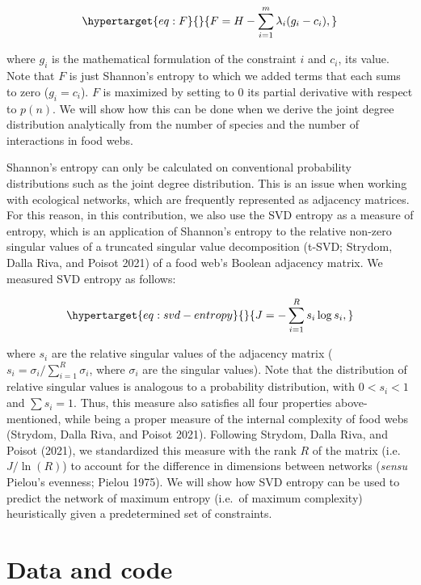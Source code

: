 \documentclass[11pt]{article}
\begin{document}
\begin{equation}\protect\hypertarget{eq:F}{}{F = H - \sum_{i=1}^m \lambda_i (g_i-c_i),}\label{eq:F}\end{equation}

where \(g_i\) is the mathematical formulation of the constraint \(i\)
and \(c_i\), its value. Note that \(F\) is just Shannon's entropy to
which we added terms that each sums to zero (\(g_i = c_i\)). \(F\) is
maximized by setting to \(0\) its partial derivative with respect to
\(p(n)\). We will show how this can be done when we derive the joint
degree distribution analytically from the number of species and the
number of interactions in food webs.

Shannon's entropy can only be calculated on conventional probability
distributions such as the joint degree distribution. This is an issue
when working with ecological networks, which are frequently represented
as adjacency matrices. For this reason, in this contribution, we also
use the SVD entropy as a measure of entropy, which is an application of
Shannon's entropy to the relative non-zero singular values of a
truncated singular value decomposition (t-SVD; Strydom, Dalla Riva, and
Poisot 2021) of a food web's Boolean adjacency matrix. We measured SVD
entropy as follows:

\begin{equation}\protect\hypertarget{eq:svd-entropy}{}{J = -\sum_{i=1}^R s_i \log s_i,}\label{eq:svd-entropy}\end{equation}

where \(s_i\) are the relative singular values of the adjacency matrix
(\(s_i = \sigma_i / \sum_{i = 1}^R \sigma_i\), where \(\sigma_i\) are
the singular values). Note that the distribution of relative singular
values is analogous to a probability distribution, with \(0 < s_i < 1\)
and \(\sum s_i = 1\). Thus, this measure also satisfies all four
properties above-mentioned, while being a proper measure of the internal
complexity of food webs (Strydom, Dalla Riva, and Poisot 2021).
Following Strydom, Dalla Riva, and Poisot (2021), we standardized this
measure with the rank \(R\) of the matrix (i.e.~\(J / \ln(R)\)) to
account for the difference in dimensions between networks (\emph{sensu}
Pielou's evenness; Pielou 1975). We will show how SVD entropy can be
used to predict the network of maximum entropy (i.e.~of maximum
complexity) heuristically given a predetermined set of constraints.

\hypertarget{data-and-code}{%
\section{Data and code}\label{data-and-code}}
\end{document}
